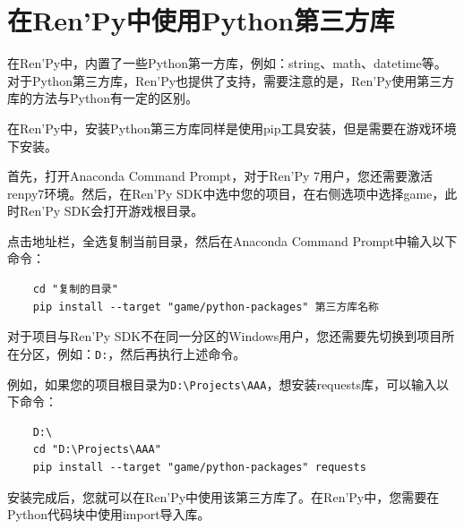 \documentclass[../../Main.tex]{subfiles}
\begin{document}
\section{在Ren'Py中使用Python第三方库}

在Ren'Py中，内置了一些Python第一方库，例如：string、math、datetime等。对于Python第三方库，Ren'Py也提供了支持，需要注意的是，Ren'Py使用第三方库的方法与Python有一定的区别。

在Ren'Py中，安装Python第三方库同样是使用pip工具安装，但是需要在游戏环境下安装。

首先，打开Anaconda Command Prompt，对于Ren'Py 7用户，您还需要激活renpy7环境。然后，在Ren'Py SDK中选中您的项目，在右侧选项中选择game，此时Ren'Py SDK会打开游戏根目录。

点击地址栏，全选复制当前目录，然后在Anaconda Command Prompt中输入以下命令：
\begin{verbatim}
    cd "复制的目录"
    pip install --target "game/python-packages" 第三方库名称
\end{verbatim}

对于项目与Ren'Py SDK不在同一分区的Windows用户，您还需要先切换到项目所在分区，例如：\verb|D:|，然后再执行上述命令。

例如，如果您的项目根目录为\verb|D:\Projects\AAA|，想安装requests库，可以输入以下命令：
\begin{verbatim}
    D:\
    cd "D:\Projects\AAA"
    pip install --target "game/python-packages" requests
\end{verbatim}

安装完成后，您就可以在Ren'Py中使用该第三方库了。在Ren'Py中，您需要在Python代码块中使用import导入库。
\end{document}
